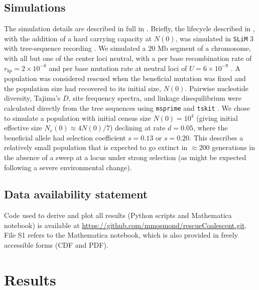 \documentclass[]{article}
\begin{document}
\subsection*{Simulations}
\label{sec:simulations}

The simulation details are described in full in .
Briefly, the lifecycle described in , with the addition of a hard carrying capacity at $N(0)$, was simulated in \texttt{SLiM} 3 \citep{Haller2019slim} with tree-sequence recording \citep{Haller2019tree}.
We simulated a 20 Mb segment of a chromosome, with all but one of the center loci neutral, with a per base recombination rate of $r_{bp}=2\times10^{-8}$ and per base mutation rate at neutral loci of $U=6\times10^{-9}$ \citep[both inspired by \textit{Drosophila} estimates;][]{mackay2012drosophila,haag2007direct}.
A population was considered rescued when the beneficial mutation was fixed and the population size had recovered to its initial size, $N(0)$.
Pairwise nucleotide diversity, Tajima's $D$, site frequency spectra, and linkage disequilibrium were calculated directly from the tree sequences using \texttt{msprime} \citep{kelleher2016efficient} and \texttt{tskit} \cite[][]{kelleher2018efficient}.
We chose to simulate a population with initial census size $N(0)=10^4$ (giving initial effective size $N_e(0)\approx4 N(0)/7$) declining at rate $d=0.05$, where the beneficial allele had selection coefficient $s=0.13$ or $s=0.20$.
This describes a relatively small population that is expected to go extinct in $\approx 200$ generations in the absence of a sweep at a locus under strong selection (as might be expected following a severe environmental change).

\subsection*{Data availability statement}
\label{sec:data}

Code used to derive and plot all results (Python scripts and Mathematica notebook) is available at \url{https://github.com/mmosmond/rescueCoalescent.git}.
File S1 refers to the Mathematica notebook, which is also provided in freely accessible forms (CDF and PDF).

\section*{Results}
\label{sec:results}
\end{document}
